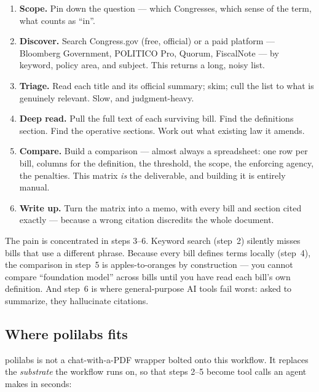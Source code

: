 \documentclass[11pt]{article}
\begin{document}
\begin{enumerate}[leftmargin=1.6em,itemsep=3pt]
\item \textbf{Scope.} Pin down the question --- which Congresses, which sense of
  the term, what counts as ``in''.
\item \textbf{Discover.} Search Congress.gov (free, official) or a paid
  platform --- Bloomberg Government, POLITICO Pro, Quorum, FiscalNote --- by
  keyword, policy area, and subject. This returns a long, noisy list.
\item \textbf{Triage.} Read each title and its official summary; skim; cull the
  list to what is genuinely relevant. Slow, and judgment-heavy.
\item \textbf{Deep read.} Pull the full text of each surviving bill. Find the
  definitions section. Find the operative sections. Work out what existing law
  it amends.
\item \textbf{Compare.} Build a comparison --- almost always a spreadsheet:
  one row per bill, columns for the definition, the threshold, the scope, the
  enforcing agency, the penalties. This matrix \emph{is} the deliverable, and
  building it is entirely manual.
\item \textbf{Write up.} Turn the matrix into a memo, with every bill and
  section cited exactly --- because a wrong citation discredits the whole
  document.
\end{enumerate}

The pain is concentrated in steps 3--6. Keyword search (step~2) silently misses
bills that use a different phrase. Because every bill defines terms locally
(step~4), the comparison in step~5 is apples-to-oranges by construction --- you
cannot compare ``foundation model'' across bills until you have read each bill's
own definition. And step~6 is where general-purpose AI tools fail worst: asked
to summarize, they hallucinate citations.

\subsection{Where polilabs fits}

polilabs is not a chat-with-a-PDF wrapper bolted onto this workflow. It replaces
the \emph{substrate} the workflow runs on, so that steps 2--5 become tool calls
an agent makes in seconds:
\end{document}
